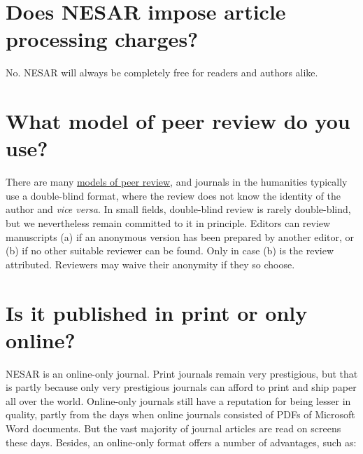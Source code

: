 \section{Does NESAR impose article processing charges?}\label{whjsbp15r2e9}
      No. NESAR will always be completely free for readers and authors alike.

\section{What model of peer review do you use?}\label{a4tnixdc6uio}
      There are many \href{https://en.wikipedia.org/wiki/Scholarly_peer_review}{models of peer review}, and journals in the humanities typically use a double-blind format, where the review does not know the identity of the author and \emph{vice versa}. In small fields, double-blind review is rarely double-blind, but we nevertheless remain committed to it in principle. Editors can review manuscripts (a) if an anonymous version has been prepared by another editor, or (b) if no other suitable reviewer can be found. Only in case (b) is the review attributed. Reviewers may waive their anonymity if they so choose.

\section{Is it published in print or only online?}\label{jmxtdjoxje14}
      NESAR is an online-only journal. Print journals remain very prestigious, but that is partly because only very prestigious journals can afford to print and ship paper all over the world. Online-only journals still have a reputation for being lesser in quality, partly from the days when online journals consisted of PDFs of Microsoft Word documents. But the vast majority of journal articles are read on screens these days. Besides, an online-only format offers a number of advantages, such as:

